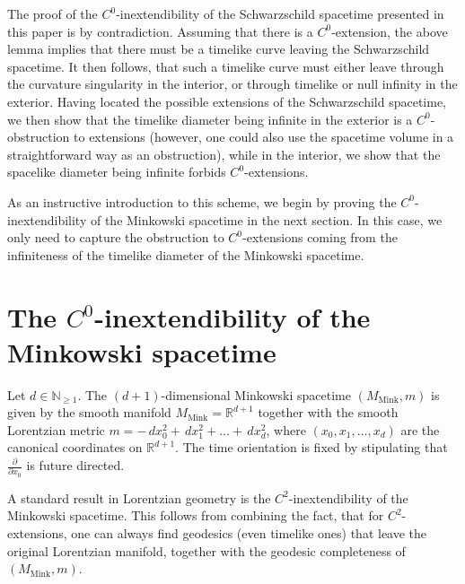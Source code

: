 \documentclass[reqno]{article}
\newcommand{\N}{\mathbb{N}}
\newcommand{\R}{\mathbb{R}}
\newcommand{\Mmink}{M_{\mathrm{Mink}}}
\begin{document}
The proof of the $C^0$-inextendibility of the Schwarzschild spacetime presented in this paper is by contradiction. Assuming that there is a $C^0$-extension, the above lemma implies that there must be a timelike curve leaving the Schwarzschild spacetime. It then follows, that such a timelike curve must either leave through the curvature singularity in the interior, or through timelike or null infinity in the exterior. Having located the possible extensions of the Schwarzschild spacetime, we then show that the timelike diameter being infinite in the exterior is a $C^0$-obstruction to extensions (however, one could also use the spacetime volume in a straightforward way as an obstruction), while in the interior, we show that the spacelike diameter being infinite forbids $C^0$-extensions. 

As an instructive introduction to this scheme, we begin by proving the $C^0$-inextendibility of the Minkowski spacetime in the next section. In this case, we only need to capture the obstruction to $C^0$-extensions coming from the infiniteness of the timelike diameter of the Minkowski spacetime.

















\section{The $C^0$-inextendibility of the Minkowski spacetime}
\label{SecMink}

Let $d \in \N_{\geq 1}$. The $(d+1)$-dimensional Minkowski spacetime $(\Mmink, m)$ is given by the smooth manifold $\Mmink = \R^{d+1}$ together with the smooth Lorentzian metric $m = -\,dx_0^2 + \, dx_1^2 + \ldots + \, dx_d^2$, where $(x_0, x_1, \ldots, x_d)$ are the canonical coordinates on $\R^{d+1}$. The time orientation is fixed by stipulating that $\frac{\partial}{\partial x_0}$ is future directed.

A standard result in Lorentzian geometry is the $C^2$-inextendibility of the Minkowski spacetime. This follows from combining the fact, that for $C^2$-extensions, one can always find geodesics (even timelike ones) that leave the original Lorentzian manifold, together with the geodesic completeness of $(\Mmink, m)$.

\end{document}
